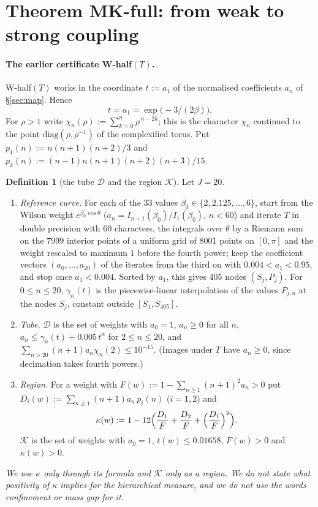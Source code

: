 \documentclass[11pt,a4paper]{article}
\theoremstyle{definition}
\newtheorem{definition}[theorem]{Definition}
\theoremstyle{remark}
\newcommand{\cD}{\mathcal{D}}
\newcommand{\cK}{\mathcal{K}}
\begin{document}
\section{Theorem MK-full: from weak to strong coupling}\label{sec:mkfull}

\paragraph{The earlier certificate W-half$(T)$.}
W-half$(T)$ works in the coordinate $t:=a_1$ of the normalised coefficients $a_n$ of \S\ref{sec:map}.
Hence
\[
t=a_1=\exp\bigl(-3/(2\beta)\bigr).
\]
For $\rho>1$ write $\chi_n(\rho):=\sum_{k=0}^{n}\rho^{\,n-2k}$; this is the character $\chi_n$ continued to the point $\mathrm{diag}(\rho,\rho^{-1})$ of the complexified torus.
Put $p_1(n):=n(n+1)(n+2)/3$ and $p_2(n):=(n-1)n(n+1)(n+2)(n+3)/15$.

\begin{definition}[the tube $\cD$ and the region $\cK$]\label{def:D}
Let $J=20$.
\begin{enumerate}[label=(\alph*),nosep]
\item \emph{Reference curve.} For each of the $33$ values $\beta_0\in\{2,2.125,\dots,6\}$, start from the Wilson weight $e^{\beta_0\cos\theta}$ ($a_n=I_{n+1}(\beta_0)/I_1(\beta_0)$, $n<60$) and iterate $T$ in double precision with $60$ characters, the integrals over $\theta$ by a Riemann sum on the $7999$ interior points of a uniform grid of $8001$ points on $[0,\pi]$ and the weight rescaled to maximum $1$ before the fourth power; keep the coefficient vectors $(a_0,\dots,a_{20})$ of the iterates from the third on with $0.004<a_1<0.95$, and stop once $a_1<0.004$.
Sorted by $a_1$, this gives $405$ nodes $(S_j,P_j)$.
For $0\le n\le20$, $\gamma_n(t)$ is the piecewise-linear interpolation of the values $P_{j,n}$ at the nodes $S_j$, constant outside $[S_1,S_{405}]$.
\item \emph{Tube.} $\cD$ is the set of weights with $a_0=1$, $a_n\ge0$ for all $n$, $a_n\le\gamma_n(t)+0.005\,t^n$ for $2\le n\le 20$, and $\sum_{n>20}(n+1)a_n\chi_n(2)\le10^{-15}$. (Images under $T$ have $a_n\ge0$, since decimation takes fourth powers.)
\item \emph{Region.} For a weight with $F(w):=1-\sum_{n\ge1}(n+1)^2a_n>0$ put $D_i(w):=\sum_{n\ge1}(n+1)a_n\,p_i(n)$ ($i=1,2$) and
\[
\kappa(w):=1-12\Bigl(\frac{D_1}{F}+\frac{D_2}{F}+\Bigl(\frac{D_1}{F}\Bigr)^2\Bigr).
\]
$\cK$ is the set of weights with $a_0=1$, $t(w)\le0.01658$, $F(w)>0$ and $\kappa(w)>0$.
\end{enumerate}
\end{definition}
\emph{We use $\kappa$ only through its formula and $\cK$ only as a region. We do not state what positivity of $\kappa$ implies for the hierarchical measure, and we do not use the words confinement or mass gap for it.}
\end{document}
